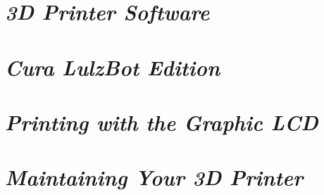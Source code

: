 \documentclass[twoside,12pt,openright,final,english]{memoir}
\newif\ifsoftware\softwaretrue %
\newif\ifcura\curatrue %
\newif\ifprintrun\printrunfalse %
\newif\ifslicer\slicerfalse %
\newif\iffirstprint\firstprintfalse %
\newif\ifglcd\glcdtrue %
\newif\ifmaintenance\maintenancetrue %
\begin{document}
\ifsoftware
\chapter{\emph{3D Printer Software}}
\thispagestyle{empty}
{}
\fi


\ifcura
\chapter{\emph{Cura LulzBot Edition}}
\thispagestyle{empty}
{}
\fi

\ifprintrun
\chapter{\emph{Printrun}}
\thispagestyle{empty}
\markboth{Printrun}{LulzBot TAZ User Manual}
{}
\fi

\iffirstprint
\chapter{\emph{Your First 3D Print}}
\label{firstprint}
\thispagestyle{empty}
\markboth{Your First 3D Print}{LulzBot TAZ User Manual}
{}
\fi

\ifslicer
\chapter{\emph{Slic3r}}
\thispagestyle{empty}
\markboth{Slic3r}{LulzBot TAZ User Manual}
{}
\fi

\ifglcd
\chapter{\emph{Printing with the Graphic LCD}}
\label{glcd}
\thispagestyle{empty}
{}
\fi

\ifmaintenance
\chapter{\emph{Maintaining Your 3D Printer}}
\thispagestyle{empty}
{}
\fi
\end{document}

